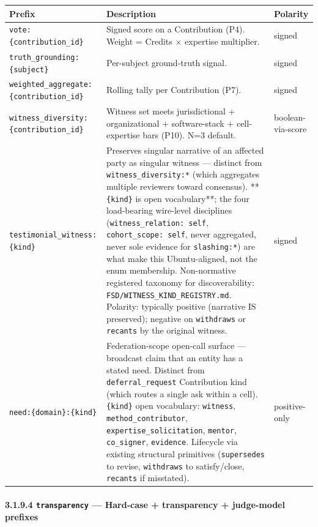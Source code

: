 \documentclass[11pt]{article}
\begin{document}
{\footnotesize
\begin{longtable}{|p{5.33cm}|p{5.33cm}|p{5.33cm}|}\hline
\textbf{Prefix} & \textbf{Description} & \textbf{Polarity} \\ \hline\endhead
\texttt{vote:\{contribution\_id\}} & Signed score on a Contribution (P4). Weight = Credits × expertise multiplier. & signed \\ \hline
\texttt{truth\_grounding:\{subject\}} & Per-subject ground-truth signal. & signed \\ \hline
\texttt{weighted\_aggregate:\{contribution\_id\}} & Rolling tally per Contribution (P7). & signed \\ \hline
\texttt{witness\_diversity:\{contribution\_id\}} & Witness set meets jurisdictional + organizational + software-stack + cell-expertise bars (P10). N=3 default. & boolean-via-score \\ \hline
\texttt{testimonial\_witness:\{kind\}} & Preserves singular narrative of an affected party as singular witness — distinct from \texttt{witness\_diversity:*} (which aggregates multiple reviewers toward consensus). **\texttt{\{kind\}} is open vocabulary**; the four load-bearing wire-level disciplines (\texttt{witness\_relation: self}, \texttt{cohort\_scope: self}, never aggregated, never sole evidence for \texttt{slashing:*}) are what make this Ubuntu-aligned, not the enum membership. Non-normative registered taxonomy for discoverability: \texttt{FSD/WITNESS\_KIND\_REGISTRY.md}. Polarity: typically positive (narrative IS preserved); negative on \texttt{withdraws} or \texttt{recants} by the original witness. & signed \\ \hline
\texttt{need:\{domain\}:\{kind\}} & Federation-scope open-call surface — broadcast claim that an entity has a stated need. Distinct from \texttt{deferral\_request} Contribution kind (which routes a single ask within a cell). \texttt{\{kind\}} open vocabulary: \texttt{witness}, \texttt{method\_contributor}, \texttt{expertise\_solicitation}, \texttt{mentor}, \texttt{co\_signer}, \texttt{evidence}. Lifecycle via existing structural primitives (\texttt{supersedes} to revise, \texttt{withdraws} to satisfy/close, \texttt{recants} if misstated). & positive-only \\ \hline
\end{longtable}}


\paragraph{3.1.9.4 \texttt{transparency} — Hard-case + transparency + judge-model prefixes}\mbox{}\\
\end{document}
